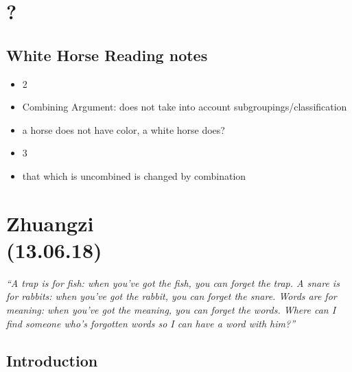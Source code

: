 \documentclass[emulatestandardclasses]{scrartcl}
\begin{document}
\section{?}


\subsection{White Horse Reading notes}

\begin{itemize}
  \item 2
  \item Combining Argument: does not take into account subgroupings/classification
  \item a horse does not have color, a white horse does?
  \item 3
  \item that which is uncombined is changed by combination
\end{itemize}


\section{Zhuangzi\\(13.06.18)}

\emph{"`A trap is for fish: when you’ve got the fish, you can forget the trap. A snare is for rabbits: when you’ve got the rabbit, you can forget the snare. Words are for meaning: when you’ve got the meaning, you can forget the words. Where can I find someone who’s forgotten words so I can have a word with him?"'}


\subsection{Introduction}
\end{document}

